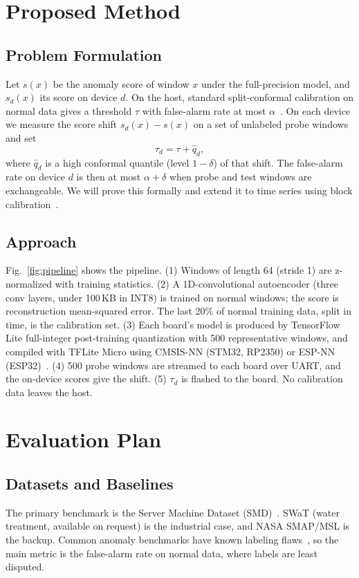 \documentclass[conference]{IEEEtran}
\begin{document}
\section{Proposed Method}
\subsection{Problem Formulation}
Let $s(x)$ be the anomaly score of window $x$ under the full-precision model, and $s_d(x)$ its score on device $d$. On the host, standard split-conformal calibration on normal data gives a threshold $\tau$ with false-alarm rate at most $\alpha$~\cite{bates2023}. On each device we measure the score shift $s_d(x)-s(x)$ on a set of unlabeled probe windows and set
\begin{equation}
\tau_d=\tau+\hat q_d,
\end{equation}
where $\hat q_d$ is a high conformal quantile (level $1-\delta$) of that shift. The false-alarm rate on device $d$ is then at most $\alpha+\delta$ when probe and test windows are exchangeable. We will prove this formally and extend it to time series using block calibration~\cite{barber2023}.

\subsection{Approach}
Fig.~\ref{fig:pipeline} shows the pipeline. (1) Windows of length 64 (stride 1) are z-normalized with training statistics. (2) A 1D-convolutional autoencoder (three conv layers, under 100\,KB in INT8) is trained on normal windows; the score is reconstruction mean-squared error. The last 20\% of normal training data, split in time, is the calibration set. (3) Each board's model is produced by TensorFlow Lite full-integer post-training quantization with 500 representative windows, and compiled with TFLite Micro using CMSIS-NN (STM32, RP2350) or ESP-NN (ESP32)~\cite{david2021}. (4) 500 probe windows are streamed to each board over UART, and the on-device scores give the shift. (5) $\tau_d$ is flashed to the board. No calibration data leaves the host.


\section{Evaluation Plan}
\subsection{Datasets and Baselines}
The primary benchmark is the Server Machine Dataset (SMD)~\cite{su2019}. SWaT (water treatment, available on request) is the industrial case, and NASA SMAP/MSL is the backup. Common anomaly benchmarks have known labeling flaws~\cite{wu2023}, so the main metric is the false-alarm rate on normal data, where labels are least disputed.
\end{document}
